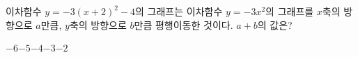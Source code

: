 이차함수 $y=-3(x+2)^2-4$의 그래프는 이차함수 $y=-3x^2$의 그래프를 $x$축의 방향으로 $a$만큼, $y$축의 방향으로 $b$만큼 평행이동한 것이다. $a+b$의 값은?
\begin{choices32}{$-6$}{$-5$}{$-4$}{$-3$}{$-2$}\end{choices32}
